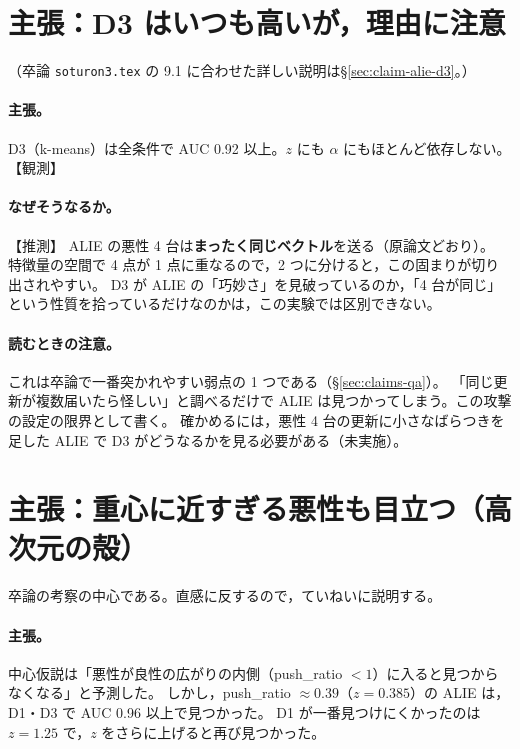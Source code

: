 \documentclass[a4j, dvipdfmx]{jsarticle}  %
\begin{document}
\section{主張：D3 はいつも高いが，理由に注意}
\label{sec:claim-d3}

（卒論 \texttt{soturon3.tex} の 9.1 に合わせた詳しい説明は\S\ref{sec:claim-alie-d3}。）

\paragraph{主張。}
D3（k-means）は全条件で AUC 0.92 以上。$z$ にも $\alpha$ にもほとんど依存しない。【観測】

\paragraph{なぜそうなるか。}【推測】
ALIE の悪性 4 台は\textbf{まったく同じベクトル}を送る（原論文どおり）。
特徴量の空間で 4 点が 1 点に重なるので，2 つに分けると，この固まりが切り出されやすい。
D3 が ALIE の「巧妙さ」を見破っているのか，「4 台が同じ」という性質を拾っているだけなのかは，この実験では区別できない。

\paragraph{読むときの注意。}
これは卒論で一番突かれやすい弱点の 1 つである（\S\ref{sec:claims-qa}）。
「同じ更新が複数届いたら怪しい」と調べるだけで ALIE は見つかってしまう。この攻撃の設定の限界として書く。
確かめるには，悪性 4 台の更新に小さなばらつきを足した ALIE で D3 がどうなるかを見る必要がある（未実施）。

\section{主張：重心に近すぎる悪性も目立つ（高次元の殻）}
\label{sec:claim-shell}

卒論の考察の中心である。直感に反するので，ていねいに説明する。

\paragraph{主張。}
中心仮説は「悪性が良性の広がりの内側（push\_ratio $< 1$）に入ると見つからなくなる」と予測した。
しかし，push\_ratio $\approx 0.39$（$z = 0.385$）の ALIE は，D1・D3 で AUC 0.96 以上で見つかった。
D1 が一番見つけにくかったのは $z = 1.25$ で，$z$ をさらに上げると再び見つかった。
\end{document}
